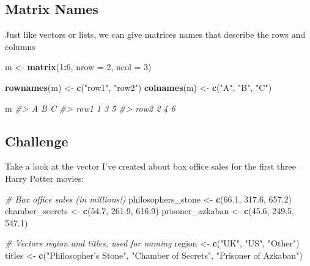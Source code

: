 \documentclass[]{book}
\newenvironment{Shaded}{\begin{snugshade}}{\end{snugshade}}
\newcommand{\CommentTok}[1]{\textcolor[rgb]{0.56,0.35,0.01}{\textit{#1}}}
\newcommand{\DataTypeTok}[1]{\textcolor[rgb]{0.13,0.29,0.53}{#1}}
\newcommand{\DecValTok}[1]{\textcolor[rgb]{0.00,0.00,0.81}{#1}}
\newcommand{\FloatTok}[1]{\textcolor[rgb]{0.00,0.00,0.81}{#1}}
\newcommand{\KeywordTok}[1]{\textcolor[rgb]{0.13,0.29,0.53}{\textbf{#1}}}
\newcommand{\NormalTok}[1]{#1}
\newcommand{\OperatorTok}[1]{\textcolor[rgb]{0.81,0.36,0.00}{\textbf{#1}}}
\newcommand{\StringTok}[1]{\textcolor[rgb]{0.31,0.60,0.02}{#1}}
\begin{document}
\hypertarget{matrix-names}{%
\subsection{Matrix Names}\label{matrix-names}}

Just like vectors or lists, we can give matrices names that describe the rows and columns

\begin{Shaded}
\begin{Highlighting}[]
\NormalTok{m <-}\StringTok{ }\KeywordTok{matrix}\NormalTok{(}\DecValTok{1}\OperatorTok{:}\DecValTok{6}\NormalTok{, }\DataTypeTok{nrow =} \DecValTok{2}\NormalTok{, }\DataTypeTok{ncol =} \DecValTok{3}\NormalTok{)}

\KeywordTok{rownames}\NormalTok{(m) <-}\StringTok{ }\KeywordTok{c}\NormalTok{(}\StringTok{"row1"}\NormalTok{, }\StringTok{"row2"}\NormalTok{)}
\KeywordTok{colnames}\NormalTok{(m) <-}\StringTok{ }\KeywordTok{c}\NormalTok{(}\StringTok{"A"}\NormalTok{, }\StringTok{"B"}\NormalTok{, }\StringTok{"C"}\NormalTok{)}

\NormalTok{m}
\CommentTok{#>      A B C}
\CommentTok{#> row1 1 3 5}
\CommentTok{#> row2 2 4 6}
\end{Highlighting}
\end{Shaded}

\hypertarget{challenge}{%
\subsection{Challenge}\label{challenge}}

Take a look at the vector I've created about box office sales for the first three Harry Potter movies:

\begin{Shaded}
\begin{Highlighting}[]
\CommentTok{# Box office sales (in millions!)}
\NormalTok{philosophers_stone <-}\StringTok{ }\KeywordTok{c}\NormalTok{(}\FloatTok{66.1}\NormalTok{, }\FloatTok{317.6}\NormalTok{, }\FloatTok{657.2}\NormalTok{)}
\NormalTok{chamber_secrets <-}\StringTok{ }\KeywordTok{c}\NormalTok{(}\FloatTok{54.7}\NormalTok{, }\FloatTok{261.9}\NormalTok{, }\FloatTok{616.9}\NormalTok{)}
\NormalTok{prisoner_azkaban <-}\StringTok{ }\KeywordTok{c}\NormalTok{(}\FloatTok{45.6}\NormalTok{, }\FloatTok{249.5}\NormalTok{, }\FloatTok{547.1}\NormalTok{)}

\CommentTok{# Vectors region and titles, used for naming}
\NormalTok{region <-}\StringTok{ }\KeywordTok{c}\NormalTok{(}\StringTok{"UK"}\NormalTok{, }\StringTok{"US"}\NormalTok{, }\StringTok{"Other"}\NormalTok{)}
\NormalTok{titles <-}\StringTok{ }\KeywordTok{c}\NormalTok{(}\StringTok{"Philosopher's Stone"}\NormalTok{, }\StringTok{"Chamber of Secrets"}\NormalTok{, }\StringTok{"Prisoner of Azkaban"}\NormalTok{)}
\end{Highlighting}
\end{Shaded}
\end{document}
